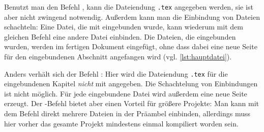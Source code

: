  Benutzt man den Befehl \texttt{}, kann die Dateiendung \texttt{.tex} angegeben werden, sie ist aber nicht zwingend notwendig. Außerdem kann man die Einbindung von Dateien schachteln: Eine Datei, die mit \texttt{} eingebunden wurde, kann wiederum mit dem gleichen Befehl eine andere Datei einbinden. Die Dateien, die eingebunden wurden, werden im fertigen Dokument eingefügt, ohne dass dabei eine neue Seite für den eingebundenen Abschnitt angefangen wird (vgl. \cref{lst:hauptdatei}).
 
 Anders verhält sich der Befehl \texttt{}: Hier wird die Dateiendung \texttt{.tex} für die eingebundenen Kapitel \emph{nicht} mit angegeben. Die Schachtelung von Einbindungen ist nicht möglich. Für jede eingebundene Datei wird außerdem eine neue Seite erzeugt. Der \texttt{}-Befehl bietet aber einen Vorteil für größere Projekte: Man kann mit dem Befehl \texttt{} direkt mehrere Dateien in der Präambel einbinden, allerdings muss hier vorher das gesamte Projekt mindestens einmal kompiliert worden sein. 
